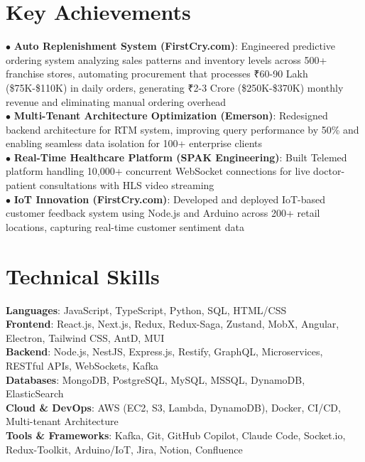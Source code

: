 \documentclass[letterpaper,12pt]{article}
\begin{document}
\section{Key Achievements}
 \begin{itemize}[leftmargin=0.15in, label={}]
    \small{\item{
     $\bullet$ \textbf{Auto Replenishment System (FirstCry.com)}{: Engineered predictive ordering system analyzing sales patterns and inventory levels across 500+ franchise stores, automating procurement that processes ₹60-90 Lakh (\$75K-\$110K) in daily orders, generating ₹2-3 Crore (\$250K-\$370K) monthly revenue and eliminating manual ordering overhead} \\
     $\bullet$ \textbf{Multi-Tenant Architecture Optimization (Emerson)}{: Redesigned backend architecture for RTM system, improving query performance by 50\% and enabling seamless data isolation for 100+ enterprise clients} \\
     $\bullet$ \textbf{Real-Time Healthcare Platform (SPAK Engineering)}{: Built Telemed platform handling 10,000+ concurrent WebSocket connections for live doctor-patient consultations with HLS video streaming} \\
     $\bullet$ \textbf{IoT Innovation (FirstCry.com)}{: Developed and deployed IoT-based customer feedback system using Node.js and Arduino across 200+ retail locations, capturing real-time customer sentiment data} \\
    }}
 \end{itemize}

\section{Technical Skills}
 \begin{itemize}[leftmargin=0.15in, label={}]
    \small{\item{
     \textbf{Languages}{: JavaScript, TypeScript, Python, SQL, HTML/CSS} \\
     \textbf{Frontend}{: React.js, Next.js, Redux, Redux-Saga, Zustand, MobX, Angular, Electron, Tailwind CSS, AntD, MUI} \\
     \textbf{Backend}{: Node.js, NestJS, Express.js, Restify, GraphQL, Microservices, RESTful APIs, WebSockets, Kafka} \\
     \textbf{Databases}{: MongoDB, PostgreSQL, MySQL, MSSQL, DynamoDB, ElasticSearch} \\
     \textbf{Cloud \& DevOps}{: AWS (EC2, S3, Lambda, DynamoDB), Docker, CI/CD, Multi-tenant Architecture} \\
     \textbf{Tools \& Frameworks}{: Kafka, Git, GitHub Copilot, Claude Code, Socket.io, Redux-Toolkit, Arduino/IoT, Jira, Notion, Confluence} \\
    }}
 \end{itemize}
\end{document}

